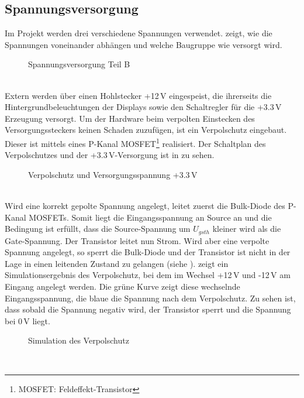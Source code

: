 \subsection{Spannungsversorgung}
Im Projekt werden drei verschiedene Spannungen verwendet.  zeigt, wie die Spannungen voneinander abhängen und welche Baugruppe wie versorgt wird. 
\begin{figure}[htp]
	\center
    \caption{Spannungsversorgung Teil B}
    \label{fig:teilb_supply}
\end{figure}\\
Extern werden über einen Hohlstecker +12\,V eingespeist, die ihrerseits die Hintergrundbeleuchtungen der Displays sowie den Schaltregler für die +3.3\,V Erzeugung versorgt. Um der Hardware beim verpolten Einstecken des Versorgungssteckers keinen Schaden zuzufügen, ist ein Verpolschutz eingebaut. Dieser ist mittels eines P-Kanal MOSFET\footnote{MOSFET: Feldeffekt-Transistor}  realisiert. Der Schaltplan des Verpolschutzes und der +3.3\,V-Versorgung ist in  zu sehen.
\begin{figure}[htp]
	\center
    \caption{Verpolschutz und Versorgungsspannung +3.3\,V}
    \label{fig:3_3_supply}
\end{figure}\\
Wird eine korrekt gepolte Spannung angelegt, leitet zuerst die Bulk-Diode des P-Kanal MOSFETs. Somit liegt die Eingangsspannung an Source an und die Bedingung ist erfüllt, dass die Source-Spannung um $U_{gsth}$ kleiner wird als die Gate-Spannung. Der Transistor leitet nun Strom. Wird aber eine verpolte Spannung angelegt, so sperrt die Bulk-Diode und der Transistor ist nicht in der Lage in einen leitenden Zustand zu gelangen (siehe \cite{Miller2010}).  zeigt ein Simulationsergebnis des Verpolschutz, bei dem im Wechsel +12\,V und -12\,V am Eingang angelegt werden. Die grüne Kurve zeigt diese wechselnde Eingangsspannung, die blaue die Spannung nach dem Verpolschutz. Zu sehen ist, dass sobald die Spannung negativ wird, der Transistor sperrt und die Spannung bei 0\,V liegt.
\begin{figure}[htp]
	\center
    \caption{Simulation des Verpolschutz}
    \label{fig:verpolschutz_sim}
\end{figure}\\

